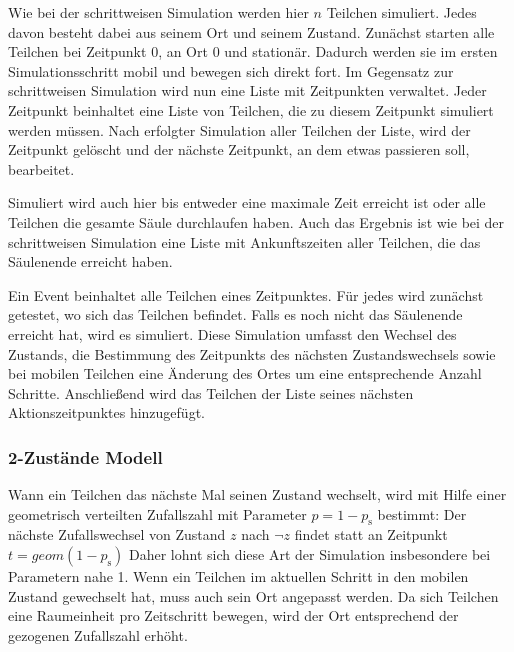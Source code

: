 Wie bei der schrittweisen Simulation werden hier $n$ Teilchen simuliert. Jedes davon besteht dabei aus seinem Ort und seinem Zustand. 
Zunächst starten alle Teilchen bei Zeitpunkt $0$, an Ort $0$ und stationär. Dadurch werden sie im ersten Simulationsschritt mobil und bewegen sich direkt fort. 
Im Gegensatz zur schrittweisen Simulation wird nun eine Liste mit Zeitpunkten verwaltet. Jeder Zeitpunkt beinhaltet eine Liste von Teilchen, die zu diesem Zeitpunkt simuliert werden müssen. Nach erfolgter Simulation aller Teilchen der Liste, wird der Zeitpunkt gelöscht und der nächste Zeitpunkt, an dem etwas passieren soll, bearbeitet.

Simuliert wird auch hier bis entweder eine maximale Zeit erreicht ist oder alle Teilchen die gesamte Säule durchlaufen haben. Auch das Ergebnis ist wie bei der schrittweisen Simulation eine Liste mit Ankunftszeiten aller Teilchen, die das Säulenende erreicht haben.


Ein Event beinhaltet alle Teilchen eines Zeitpunktes. Für jedes wird zunächst getestet, wo sich das Teilchen befindet. Falls es noch nicht das Säulenende erreicht hat, wird es simuliert. Diese Simulation umfasst den Wechsel des Zustands, die Bestimmung des Zeitpunkts des nächsten Zustandswechsels sowie bei mobilen Teilchen eine Änderung des Ortes um eine entsprechende Anzahl Schritte. Anschließend wird das Teilchen der Liste seines nächsten Aktionszeitpunktes hinzugefügt.

\subsubsection{2-Zustände Modell}

Wann ein Teilchen das nächste Mal seinen Zustand wechselt, wird mit Hilfe einer geometrisch verteilten Zufallszahl mit Parameter $p=1-p_\text{s}$  bestimmt: Der nächste Zufallswechsel von Zustand $z$ nach $\neg z$ findet statt an Zeitpunkt $t= geom(1-p_{\text{s}})$ %
Daher lohnt sich diese Art der Simulation insbesondere bei Parametern nahe 1. 
Wenn ein Teilchen im aktuellen Schritt in den mobilen Zustand gewechselt hat, muss auch sein Ort angepasst werden. Da sich Teilchen eine Raumeinheit pro Zeitschritt bewegen, wird der Ort entsprechend der gezogenen Zufallszahl erhöht.


